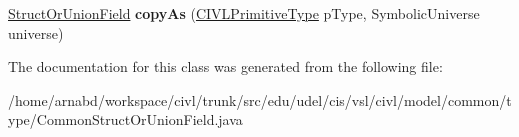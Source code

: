 \begin{DoxyCompactItemize}
\item 
\hypertarget{classedu_1_1udel_1_1cis_1_1vsl_1_1civl_1_1model_1_1common_1_1type_1_1CommonStructOrUnionField_ae9d7416c86e20061cfdc3d87c2db8ae2}{}\hyperlink{interfaceedu_1_1udel_1_1cis_1_1vsl_1_1civl_1_1model_1_1IF_1_1type_1_1StructOrUnionField}{Struct\+Or\+Union\+Field} {\bfseries copy\+As} (\hyperlink{interfaceedu_1_1udel_1_1cis_1_1vsl_1_1civl_1_1model_1_1IF_1_1type_1_1CIVLPrimitiveType}{C\+I\+V\+L\+Primitive\+Type} p\+Type, Symbolic\+Universe universe)\label{classedu_1_1udel_1_1cis_1_1vsl_1_1civl_1_1model_1_1common_1_1type_1_1CommonStructOrUnionField_ae9d7416c86e20061cfdc3d87c2db8ae2}

\end{DoxyCompactItemize}


The documentation for this class was generated from the following file\+:\begin{DoxyCompactItemize}
\item 
/home/arnabd/workspace/civl/trunk/src/edu/udel/cis/vsl/civl/model/common/type/Common\+Struct\+Or\+Union\+Field.\+java\end{DoxyCompactItemize}
